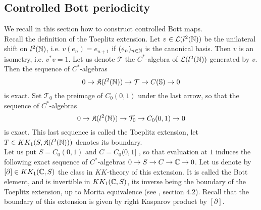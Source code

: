 
\subsection{Controlled Bott periodicity}

We recall in this section how to construct controlled Bott maps. \\

Recall the definition of the Toeplitz extension. Let $v\in \mathcal L(l^2(\mathbb N))$ be the unilateral shift on $l^2(\mathbb N)$, i.e. $v(e_n) = e_{n+1}$ if $(e_n)_{n\in \mathbb N}$ is the canonical basis. Then $v$ is an isometry, i.e. $v^*v = 1$. Let us denote $\mathcal T $ the $C^*$-algebra of $\mathcal L(l^2(\mathbb N))$ generated by $v$. Then the sequence of $C^*$-algebras 
\[0\rightarrow \mathfrak K(l^2(\mathbb N)) \rightarrow \mathcal T \rightarrow C(\mathbb S) \rightarrow 0 \]
is exact. Set $\mathcal T_0$ the preimage of $C_0(0,1)$ under the last arrow, so that the sequence of $C^*$-algebras
\[0\rightarrow \mathfrak K(l^2(\mathbb N)) \rightarrow \mathcal T_0 \rightarrow C_0(0,1) \rightarrow 0 \]
is exact. This last sequence is called the Toeplitz extension, let $T\in KK_1(S, \mathfrak K(l^2(\mathbb N)) )$ denotes its boundary.\\

Let us put $S = C_0(0,1)$ and $C= C_0(0,1]$ , so that evaluation at $1$ induces the following exact sequence of $C^*$-algebras $0\rightarrow S \rightarrow C \rightarrow \mathbb C \rightarrow  0 $. Let us denote by $[\partial]\in KK_1(\mathbb C,S)$ the class in $KK$-theory of this extension. It is called the Bott element, and is invertible in $KK_1(\mathbb C,S)$, its inverse being the boundary of the Toeplitz extension, up to Morita equivalence (see \cite{OY2}, section $4.2$). Recall that the boundary of this extension is given by right Kasparov product by $[\partial]$.\\ 

